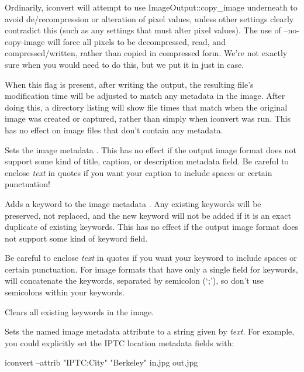 Ordinarily, {\cf iconvert} will attempt to use {\cf
  ImageOutput::copy_image}
underneath to avoid de/recompression or alteration of pixel values,
unless other settings clearly contradict this (such as any settings
that must alter pixel values).  The use of {\cf --no-copy-image} will
force all pixels to be decompressed, read, and compressed/written,
rather than copied in compressed form.  We're not exactly sure when
you would need to do this, but we put it in just in case.
\apiend

When this flag is present, after writing the output, the resulting
file's modification time will be adjusted to match any 
metadata in the image.  After doing this, a directory listing will show
file times that match when the original image was created or captured,
rather than simply when {\cf iconvert} was run.  This has no effect on
image files that don't contain any  metadata.
\apiend

Sets the image metadata .
This has no effect if the output image format does not support some kind
of title, caption, or description metadata field.
Be careful to enclose \emph{text} in quotes if you want your caption to
include spaces or certain punctuation!
\apiend

Adds a keyword to the image metadata .  Any existing
keywords will be preserved, not replaced, and the new keyword will not
be added if it is an exact duplicate of existing keywords.  This has no
effect if the output image format does not support some kind of keyword
field.  

Be careful to enclose \emph{text} in quotes if you want your keyword to
include spaces or certain punctuation.  For image formats that have only
a single field for keywords, \OpenImageIO will concatenate the keywords,
separated by semicolon (`;'), so don't use semicolons within your
keywords.
\apiend

Clears all existing keywords in the image.
\apiend

Sets the named image metadata attribute to a string given by
\emph{text}.  For example, you could explicitly set the IPTC location
metadata fields with:

\begin{code}
        iconvert --attrib "IPTC:City" "Berkeley" in.jpg out.jpg
\end{code}
\apiend

